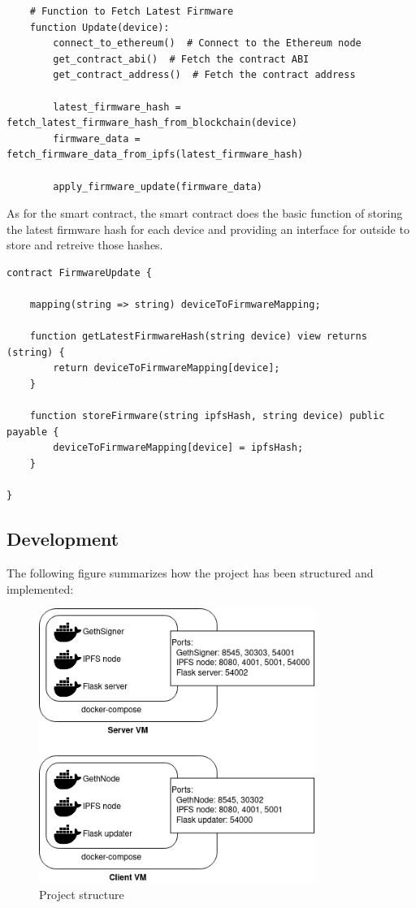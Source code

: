 \documentclass{article}
\begin{document}
\begin{lstlisting}
    # Function to Fetch Latest Firmware
    function Update(device):
        connect_to_ethereum()  # Connect to the Ethereum node
        get_contract_abi()  # Fetch the contract ABI
        get_contract_address()  # Fetch the contract address

        latest_firmware_hash = fetch_latest_firmware_hash_from_blockchain(device)
        firmware_data = fetch_firmware_data_from_ipfs(latest_firmware_hash)

        apply_firmware_update(firmware_data)
\end{lstlisting}

As for the smart contract, the smart contract does the basic function of storing the latest firmware hash for each device and providing an interface for outside to store and retreive those hashes.
\begin{lstlisting}
contract FirmwareUpdate {

    mapping(string => string) deviceToFirmwareMapping;

    function getLatestFirmwareHash(string device) view returns (string) {
        return deviceToFirmwareMapping[device];
    }
    
    function storeFirmware(string ipfsHash, string device) public payable {
        deviceToFirmwareMapping[device] = ipfsHash;
    }

}

\end{lstlisting}
\newpage
\subsection{Development}
The following figure summarizes how the project has been structured and implemented:
\begin{figure}[H]
    \centering
    \includegraphics[width=0.8\textwidth]{development.png}
    \caption{Project structure}
\end{figure}
\end{document}
